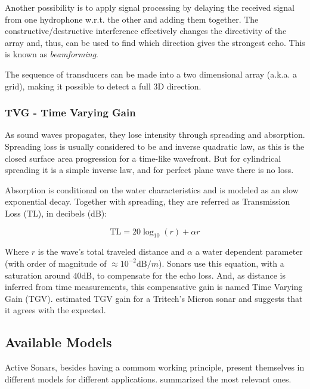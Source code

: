 
Another possibility is to apply signal processing by delaying the received
signal from one hydrophone w.r.t. the other and adding them together. The
constructive/destructive interference effectively changes the directivity of the
array and, thus, can be used to find which direction gives the strongest echo.
This is known as \textit{beamforming}.

The sequence of transducers can be made into a two dimensional array
(a.k.a. a grid), making it possible to detect a full 3D direction.

\subsubsection{TVG - Time Varying Gain}\label{sss:tvg}

As sound waves propagates, they lose intensity through spreading and absorption.
Spreading loss is usually considered to be and inverse quadratic
law\cite{Etter2013}, as this is the closed surface area progression for
a time-like wavefront. But for cylindrical spreading it is a simple inverse law,
and for perfect plane wave there is no loss.

Absorption is conditional on the water characteristics and is modeled as an
slow exponential decay. Together with spreading, they are referred as
Transmission Loss ($\text{TL}$), in decibels (dB):

\begin{equation*}
\text{TL} = 20\log_{10}(r) + \alpha r
\end{equation*}

Where $r$ is the wave's total traveled distance and $\alpha$ a water dependent
parameter (with order of magnitude of $\approx 10^{-2} \text{dB}/m$). Sonars use
this equation, with a saturation around $40$dB, to compensate for the echo
loss\cite{chu2006time}. And, as distance is inferred from time measurements,
this compensative gain is named Time Varying Gain (TGV). \citet{chew2013object}
estimated TGV gain for a Tritech's Micron sonar and suggests that it agrees with
the expected.


\subsection{Available Models}
\label{ss:avaible_models}
 
Active Sonars, besides having a commom working principle, present themselves in
different models for different applications. \citet{sonars:16} summarized the
most relevant ones.

